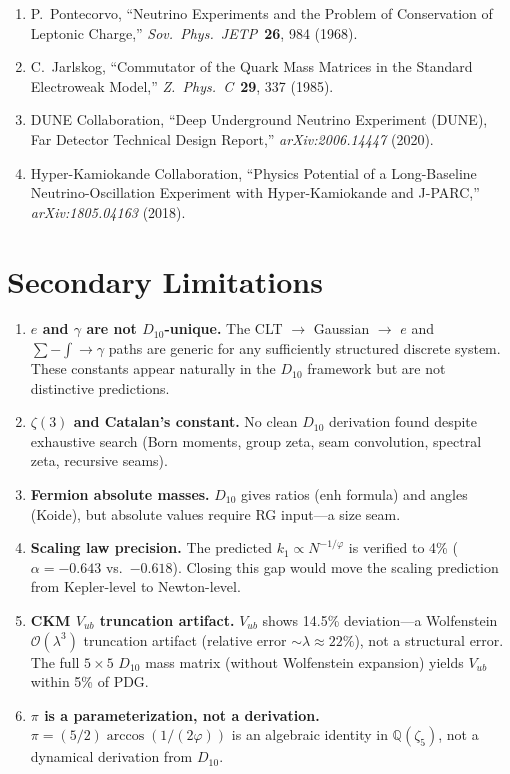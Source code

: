 \documentclass[11pt,a4paper]{article}
\begin{document}
\begin{enumerate}
\item P.~Pontecorvo, ``Neutrino Experiments and the Problem of Conservation of Leptonic Charge,'' \textit{Sov.\ Phys.\ JETP}\ \textbf{26}, 984 (1968).
\item C.~Jarlskog, ``Commutator of the Quark Mass Matrices in the Standard Electroweak Model,'' \textit{Z.\ Phys.\ C}\ \textbf{29}, 337 (1985).
\item DUNE Collaboration, ``Deep Underground Neutrino Experiment (DUNE), Far Detector Technical Design Report,'' \textit{arXiv:2006.14447} (2020).
\item Hyper-Kamiokande Collaboration, ``Physics Potential of a Long-Baseline Neutrino-Oscillation Experiment with Hyper-Kamiokande and J-PARC,'' \textit{arXiv:1805.04163} (2018).
\end{enumerate}

\appendix
\section{Secondary Limitations}
\label{app:secondary}

\begin{enumerate}
\item \textbf{$e$ and $\gamma$ are not $D_{10}$-unique.} The CLT $\to$ Gaussian $\to$ $e$ and $\sum - \int \to \gamma$ paths are generic for any sufficiently structured discrete system. These constants appear naturally in the $D_{10}$ framework but are not distinctive predictions.

\item \textbf{$\zeta(3)$ and Catalan's constant.} No clean $D_{10}$ derivation found despite exhaustive search (Born moments, group zeta, seam convolution, spectral zeta, recursive seams).

\item \textbf{Fermion absolute masses.} $D_{10}$ gives ratios (enh formula) and angles (Koide), but absolute values require RG input---a size seam.

\item \textbf{Scaling law precision.} The predicted $k_1 \propto N^{-1/\varphi}$ is verified to 4\% ($\alpha = -0.643$ vs.\ $-0.618$). Closing this gap would move the scaling prediction from Kepler-level to Newton-level.

\item \textbf{CKM $V_{ub}$ truncation artifact.} $V_{ub}$ shows 14.5\% deviation---a Wolfenstein $\mathcal{O}(\lambda^3)$ truncation artifact (relative error $\sim \lambda \approx 22\%$), not a structural error. The full $5\times 5$ $D_{10}$ mass matrix (without Wolfenstein expansion) yields $V_{ub}$ within 5\% of PDG.

\item \textbf{$\pi$ is a parameterization, not a derivation.} $\pi = (5/2)\arccos(1/(2\varphi))$ is an algebraic identity in $\mathbb{Q}(\zeta_5)$, not a dynamical derivation from $D_{10}$.
\end{enumerate}
\end{document}
